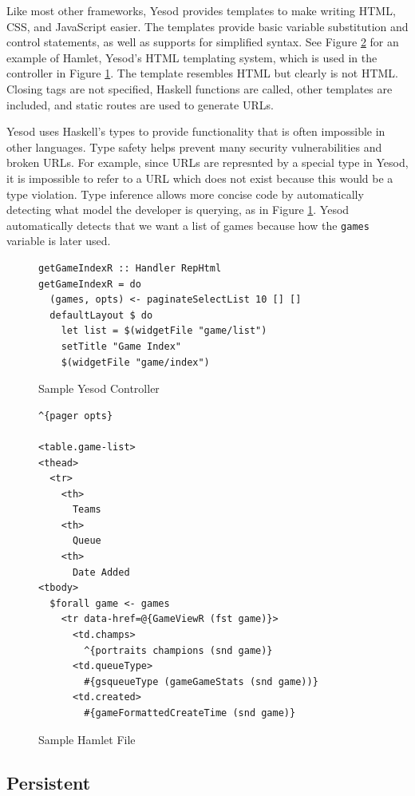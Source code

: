 \documentclass[letterpaper,twocolumn,9pt]{article}
\newcommand{\code}[1]{\texttt{#1}}
\begin{document}
Like most other frameworks, Yesod provides templates to make writing HTML, CSS, and JavaScript easier. The templates provide basic variable substitution and control statements, as well as supports for simplified syntax. See Figure \ref{hamlet} for an example of Hamlet, Yesod's HTML templating system, which is used in the controller in Figure \ref{controller}. The template resembles HTML but clearly is not HTML. Closing tags are not specified, Haskell functions are called, other templates are included, and static routes are used to generate URLs.

Yesod uses Haskell's types to provide functionality that is often impossible in other languages. Type safety helps prevent many security vulnerabilities and broken URLs. For example, since URLs are represnted by a special type in Yesod, it is impossible to refer to a URL which does not exist because this would be a type violation. Type inference allows more concise code by automatically detecting what model the developer is querying, as in Figure \ref{controller}. Yesod automatically detects that we want a list of games because how the \code{games} variable is later used.


\begin{figure}[]
\footnotesize{
\begin{verbatim}
getGameIndexR :: Handler RepHtml
getGameIndexR = do
  (games, opts) <- paginateSelectList 10 [] []
  defaultLayout $ do
    let list = $(widgetFile "game/list")
    setTitle "Game Index"
    $(widgetFile "game/index")
\end{verbatim}
}
    \caption{Sample Yesod Controller}
    \label{controller}
\end{figure}

\begin{figure}[]
\footnotesize{
\begin{verbatim}
^{pager opts}

<table.game-list>
<thead>
  <tr>
    <th>
      Teams
    <th>
      Queue
    <th>
      Date Added
<tbody>
  $forall game <- games
    <tr data-href=@{GameViewR (fst game)}>
      <td.champs>
        ^{portraits champions (snd game)}
      <td.queueType>
        #{gsqueueType (gameGameStats (snd game))}
      <td.created>
        #{gameFormattedCreateTime (snd game)}
\end{verbatim}
}
    \caption{Sample Hamlet File}
    \label{hamlet}
\end{figure}

\subsection{Persistent}
\end{document}
